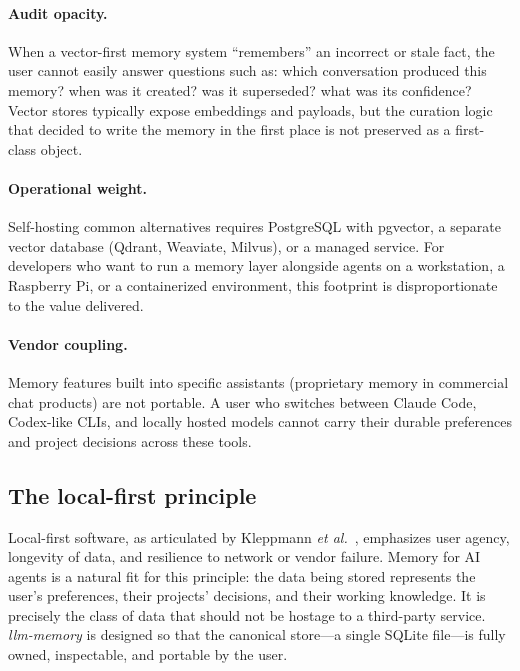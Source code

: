 \documentclass[11pt,a4paper]{article}
\begin{document}
\paragraph{Audit opacity.} When a vector-first memory system ``remembers'' an incorrect or stale fact, the user cannot easily answer questions such as: which conversation produced this memory? when was it created? was it superseded? what was its confidence? Vector stores typically expose embeddings and payloads, but the curation logic that decided to write the memory in the first place is not preserved as a first-class object.

\paragraph{Operational weight.} Self-hosting common alternatives requires PostgreSQL with pgvector, a separate vector database (Qdrant, Weaviate, Milvus), or a managed service. For developers who want to run a memory layer alongside agents on a workstation, a Raspberry Pi, or a containerized environment, this footprint is disproportionate to the value delivered.

\paragraph{Vendor coupling.} Memory features built into specific assistants (proprietary memory in commercial chat products) are not portable. A user who switches between Claude Code, Codex-like CLIs, and locally hosted models cannot carry their durable preferences and project decisions across these tools.

\subsection{The local-first principle}

Local-first software, as articulated by Kleppmann \textit{et al.}~\cite{kleppmann2019localfirst}, emphasizes user agency, longevity of data, and resilience to network or vendor failure. Memory for AI agents is a natural fit for this principle: the data being stored represents the user's preferences, their projects' decisions, and their working knowledge. It is precisely the class of data that should not be hostage to a third-party service. \textit{llm-memory} is designed so that the canonical store---a single SQLite file---is fully owned, inspectable, and portable by the user.

\end{document}
